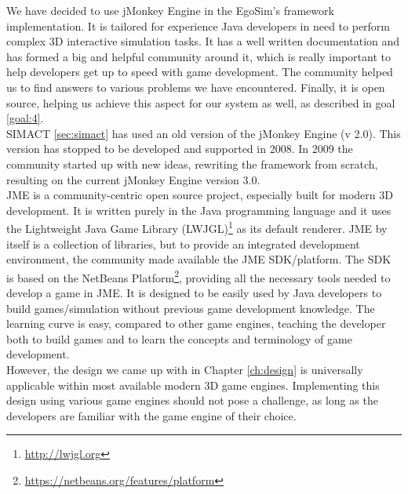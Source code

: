 We have decided to use jMonkey Engine in the EgoSim's framework implementation. It is tailored for experience Java developers in need to perform complex 3D interactive simulation tasks. It has a well written documentation and has formed a big and helpful community around it, which is really important to help developers get up to speed with game development. The community helped us to find answers to various problems we have encountered. Finally, it is open source, helping us achieve this aspect for our system as well, as described in goal \ref{goal:4}.\\

SIMACT \ref{sec:simact} has used an old version of the jMonkey Engine (v 2.0). This version has stopped to be developed and supported in 2008. In 2009 the community started up with new ideas, rewriting the framework from scratch, resulting on the current jMonkey Engine version 3.0.\\

JME is a community-centric open source project, especially built for modern 3D development. It is written purely in the Java programming language and it uses the Lightweight Java Game Library (LWJGL)\footnote{\url{http://lwjgl.org}} as its default renderer. JME by itself is a collection of libraries, but to provide an integrated development environment, the community made available the JME SDK/platform. The SDK is based on the NetBeans Platform\footnote{\url{https://netbeans.org/features/platform}}, providing all the necessary tools needed to develop a game in JME. It is designed to be easily used by Java developers to build games/simulation without previous game development knowledge. The learning curve is easy, compared to other game engines, teaching the developer both to build games and to learn the concepts and terminology of game development.\\

However, the design we came up with in Chapter \ref{ch:design} is universally applicable within most available modern 3D game engines. Implementing this design using various game engines should not pose a challenge, as long as the developers are familiar with the game engine of their choice.\\

